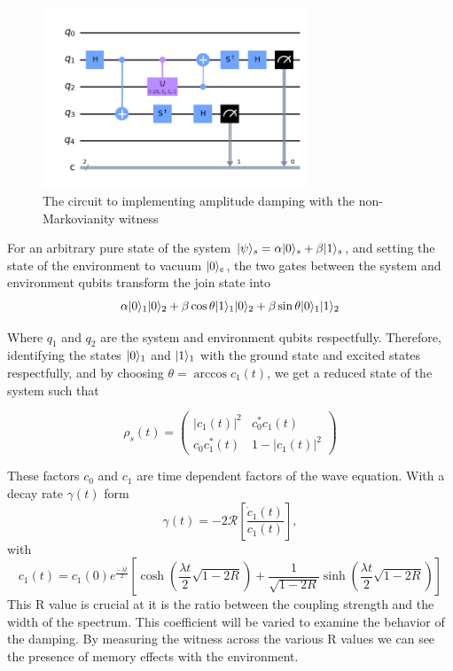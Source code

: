 \documentclass[12pt]{article}
\DeclarePairedDelimiter{\ket}{\lvert}{\rangle}
\begin{document}
  \begin{figure}[h]
    \centering
    \includegraphics[width=0.7\textwidth]{images/amplitude_damping_yy_circuit}
    \caption{The circuit to implementing amplitude damping with the non-Markovianity witness %
            \label{fig:amplitude_damping_circuit}}
  \end{figure}
  For an arbitrary pure state of the system $\ket{\psi}_{s} = \alpha\ket{0}_{s} + \beta\ket{1}_{s}$, and setting the state of the environment to vacuum $\ket{0}_{e}$, the two gates between the system and environment qubits transform the join state into 
  \begin{equation}
    \alpha\ket{0}_{1}\ket{0}_{2} + \beta\cos \theta \ket{1}_{1}\ket{0}_{2} + \beta\sin \theta \ket{0}_{1}\ket{1}_{2}
  \end{equation}

  Where $q_{1}$ and $q_{2}$ are the system and environment qubits respectfully. Therefore, identifying the states $\ket{0}_{1}$ and $\ket{1}_{1}$ with the ground state and excited states respectfully, and by choosing $\theta = \arccos c_{1}(t)$, we get a reduced state of the system such that

  \begin{equation}
    \rho_{s}(t) = \begin{pmatrix}
        \lvert c_{1}(t)\rvert^2 & c_{0}^{*}c_{1}(t) \\
        c_{0}c_{1}^{*}(t) & 1 - \lvert c_{1}(t)\rvert^2 
    \end{pmatrix}
  \end{equation}

  These factors $c_{0}$ and $c_{1}$ are time dependent factors of the wave equation. With a decay rate $\gamma(t)$ form
  \begin{equation}
    \gamma(t) = -2\mathcal{R} \left[ \frac{\dot{c}_{1}(t)}{c_{1}(t)} \right],
  \end{equation}
  with 
  \begin{equation}
    c_{1}(t) = c_{1}(0)e^{\frac{-\lambda t}{2}} \left[ \cosh (\frac{\lambda t}{2} \sqrt{1 - 2R}) + \frac{1}{\sqrt{1 - 2R}} \sinh (\frac{\lambda t}{2} \sqrt{1 - 2R}) \right]
  \end{equation}
  This R value is crucial at it is the ratio between the coupling strength and the width of the spectrum. This coefficient will be varied to examine the behavior of the damping. By measuring the witness across the various R values we can see the presence of memory effects with the environment.
\end{document}
